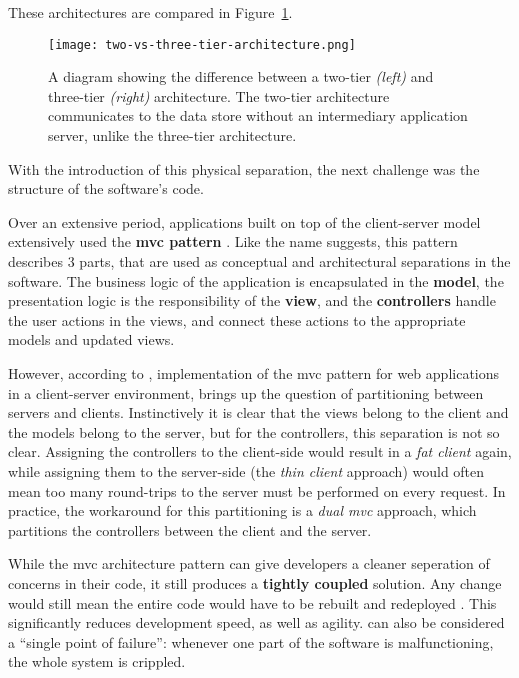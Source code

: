 These architectures are compared in Figure~\ref{fig:two-vs-three-tier-architecture}.

\begin{figure}
    \centering
    \texttt{[image: two-vs-three-tier-architecture.png]}
    \caption[Two vs three tier architecture]{A diagram showing the difference
        between a two-tier \textit{(left)} and three-tier \textit{(right)}
        architecture. The two-tier architecture communicates to the data store
        without an intermediary application server, unlike the three-tier
        architecture.}
    \label{fig:two-vs-three-tier-architecture}
\end{figure}

With the introduction of this physical separation, the next challenge was the
structure of the software's code.  

Over an extensive period, applications built on top of the client-server model
extensively used the \textbf{\gls{mvc} pattern} \autocite{Pavlenko_etal_2020}.
Like the name suggests, this pattern describes 3 parts, that are used as
conceptual and architectural separations in the software. The business logic of
the application is encapsulated in the \textbf{model}, the presentation logic is
the responsibility of the \textbf{view}, and the \textbf{controllers} handle the
user actions in the views, and connect these actions to the appropriate models
and updated views.

However, according to \textcite{Leff_Raylfield_2001}, implementation of the
\gls{mvc} pattern for web applications in a client-server environment, brings up
the question of partitioning between servers and clients. Instinctively it is
clear that the views belong to the client and the models belong to the server,
but for the controllers, this separation is not so clear. Assigning the
controllers to the client-side would result in a \textit{fat client} again,
while assigning them to the server-side (the \textit{thin client} approach)
would often mean too many round-trips to the server must be performed on every
request. In practice, the workaround for this partitioning is a \textit{dual
\gls{mvc}} approach, which partitions the controllers between the client and the
server.


While the \gls{mvc} architecture pattern can give developers a cleaner
seperation of concerns in their code, it still produces a \textbf{tightly
coupled} solution. Any change would still mean the entire code would have to be
rebuilt and redeployed \autocite{Fowler_Microservices_2014}. This significantly
reduces development speed, as well as agility.  can also be considered
a  ``single point of failure'': whenever one part of the software is
malfunctioning, the whole system is crippled.


